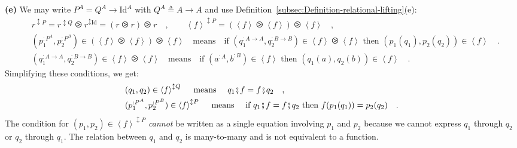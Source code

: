 \textbf{(e)} We may write $P^{A}=Q^{A}\rightarrow\text{Id}^{A}$ with
$Q^{A}\triangleq A\rightarrow A$ and use Definition~\ref{subsec:Definition-relational-lifting}(e):
\begin{align*}
 & r^{\updownarrow P}=r^{\updownarrow Q}\ogreaterthan r^{\updownarrow\text{Id}}=(r\ogreaterthan r)\ogreaterthan r\quad,\quad\quad\left<f\right>^{\updownarrow P}=(\left<f\right>\ogreaterthan\left<f\right>)\ogreaterthan\left<f\right>\quad,\\
 & (p_{1}^{:P^{A}},p_{2}^{:P^{B}})\in(\left<f\right>\ogreaterthan\left<f\right>)\ogreaterthan\left<f\right>\quad\text{means}\quad\text{if }(q_{1}^{:A\rightarrow A},q_{2}^{:B\rightarrow B})\in\left<f\right>\ogreaterthan\left<f\right>\text{ then }(p_{1}(q_{1}),p_{2}(q_{2}))\in\left<f\right>\quad.\\
 & (q_{1}^{:A\rightarrow A},q_{2}^{:B\rightarrow B})\in\left<f\right>\ogreaterthan\left<f\right>\quad\text{means}\quad\text{if }(a^{:A},b^{:B})\in\left<f\right>\text{ then }(q_{1}(a),q_{2}(b))\in\left<f\right>\quad.
\end{align*}
Simplifying these conditions, we get:
\begin{align}
 & (q_{1},q_{2})\in\left<f\right>^{\updownarrow Q}\quad\text{ means }\quad q_{1}\bef f=f\bef q_{2}\quad,\nonumber \\
 & (p_{1}^{:P^{A}},p_{2}^{:P^{B}})\in\left<f\right>^{\updownarrow P}\quad\text{ means }\quad\text{if }q_{1}\bef f=f\bef q_{2}\text{ then }f(p_{1}(q_{1}))=p_{2}(q_{2})\quad.\label{eq:relational-lifting-example-e-derivation1}
\end{align}
The condition for $(p_{1},p_{2})\in\left<f\right>^{\updownarrow P}$
\emph{cannot} be written as a single equation involving $p_{1}$ and
$p_{2}$ because we cannot express $q_{1}$ through $q_{2}$ or $q_{2}$
through $q_{1}$. The relation between $q_{1}$ and $q_{2}$ is many-to-many
and is not equivalent to a function.

